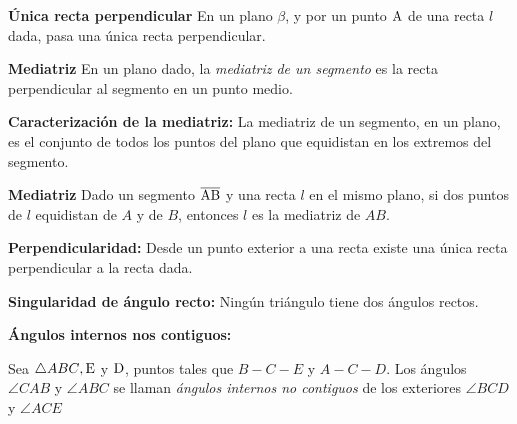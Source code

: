 \begin{theorem}{\textbf{Única recta perpendicular}}
    En un plano $\beta$, y por un punto $\rm A$ de una recta $l$ dada, pasa una única recta perpendicular.
\end{theorem}

\begin{definition}{\textbf{Mediatriz}}
    En un plano dado, la \textit{mediatriz de un segmento} es la recta perpendicular al segmento en un punto medio.

    \begin{figure}[!h]
        \centering
        
        \label{fig:bisector}
    \end{figure}
    
\end{definition}

\begin{theorem}{\textbf{Caracterización de la mediatriz:}}
    La mediatriz de un segmento, en un plano, es el conjunto de todos los puntos del plano que equidistan en los extremos del segmento.
\end{theorem}

\begin{theorem}{\textbf{Mediatriz}}
    Dado un segmento $\overline{\rm AB}$ y una recta $l$ en el mismo plano, si dos puntos de $l$ equidistan de $A$ y de $B$, entonces $l$ es la mediatriz de $AB$.
\end{theorem}

\begin{theorem}{\textbf{Perpendicularidad:}}
    Desde un punto exterior a una recta existe una única recta perpendicular a la recta dada.
\end{theorem}

\begin{theorem}{\textbf{Singularidad de ángulo recto:}}
    Ningún triángulo tiene dos ángulos rectos.
\end{theorem}

\begin{definition}{\textbf{Ángulos internos nos contiguos:}}

Sea $\triangle{ABC}, \rm E$ y $\rm D$, puntos tales que $B-C-E$ y $A-C-D$. Los ángulos $\angle{CAB}$ y $\angle{ABC}$ se llaman \textit{ángulos internos no contiguos} de los exteriores $\angle{BCD}$ y $\angle{ACE}$

    \begin{figure}[!h]
        \centering
        
        \label{fig:intext-angles}
    \end{figure}
    
\end{definition}

